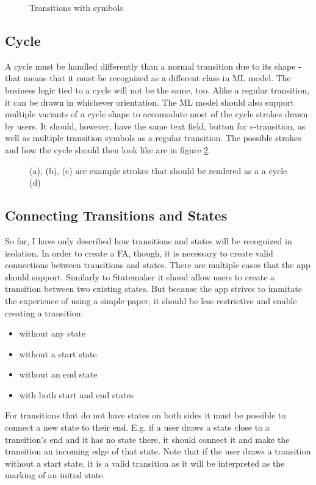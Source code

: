 \begin{figure}
    \centering
    \caption{Transitions with symbols}\label{transition-symbols}
\end{figure}

\subsection{Cycle}

A cycle must be handled differently than a normal transition due to its shape - that means that it must be recognized as a different class in ML model. The business logic tied to a cycle will not be the same, too. Alike a regular transition, it can be drawn in whichever orientation. The ML model should also support multiple variants of a cycle shape to accomodate most of the cycle strokes drawn by users. It should, however, have the same text field, button for $\epsilon$-transition, as well as multiple transition symbols as a regular transition. The possible strokes and how the cycle should then look like are in figure \ref{cycle}.

\begin{figure}
    \centering
    \caption{(a), (b), (c) are example strokes that should be rendered as a a cycle (d)}\label{cycle}
\end{figure}

\subsection{Connecting Transitions and States}

So far, I have only described how transitions and states will be recognized in isolation. In order to create a FA, though, it is necessary to create valid connections between transitions and states. There are multiple cases that the app should support. Similarly to Statemaker \cite{state-maker} it shoud allow users to create a transition between two existing states. But because the app strives to immitate the experience of using a simple paper, it should be less restrictive and enable creating a transition:
\begin{itemize}
    \item without any state
    \item without a start state
    \item without an end state
    \item with both start and end states
\end{itemize}
For transitions that do not have states on both sides it must be possible to connect a new state to their end. E.g. if a user draws a state close to a transition's end and it has no state there, it should connect it and make the transition an incoming edge of that state. Note that if the user draws a transition without a start state, it is a valid transition as it will be interpreted as the marking of an initial state.

